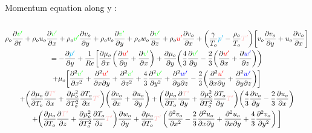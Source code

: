 \documentclass[ border=0pt, a4paper, 11pt]{article}
\numberwithin{equation}{section}
\numberwithin{equation}{section}
\renewcommand{\u}{\textcolor{red}{u'}}
\renewcommand{\v}{\textcolor{green}{v'}}
\newcommand{\w}{\textcolor{blue}{w'}}
\newcommand{\p}{\textcolor{cyan}{p'}}
\newcommand{\T}{\textcolor{pink}{T'}}
\begin{document}
Momentum equation along y :
\begin{multline}
\\\rho_o\frac{\partial \v }{\partial t} 
%
+\rho_ou_o\frac{\partial \v }{\partial x} + \rho_o\v \frac{\partial v_o}{\partial y}+\rho_ov_o\frac{\partial \v }{\partial y}+ \rho_ow_o\frac{\partial \v }{\partial z}
%
+\rho_o\u \frac{\partial v_o}{\partial x}
%
+ \bigg(\frac{\gamma}{T_o} \p  - \frac{\rho_o}{T_o} \T\bigg)\bigg[v_o\frac{\partial v_o}{\partial y} + u_o \frac{ \partial v_o} {\partial x}\bigg] \\
%
=-\frac{\partial \p }{\partial y} 
%
 + \frac{1}{Re} \bigg[\frac{\partial\mu_o}{\partial x}\bigg( \frac{\partial \u}{\partial y}+ \frac{\partial \v}{\partial x}   \bigg) +\frac{\partial\mu_o}{\partial y}\bigg( \frac{4}{3}\frac{\partial \v}{\partial y} - \frac{2}{3} \bigg(\frac{\partial \u}{\partial x}+ \frac{\partial \w}{\partial z}\bigg)    \bigg)\\
 +\mu_o\bigg[ \frac{\partial^2 \v}{\partial x^2}+\frac{\partial^2 \u }{\partial x\partial  y}+ \frac{\partial^2 \v }{ \partial z^2}+\frac{4}{3}\frac{\partial^2 \v }{ \partial y^2}+\frac{\partial^2 \w }{\partial y \partial z}-\frac{2}{3}\bigg(\frac{\partial^2 \u}{\partial x\partial y}+\frac{\partial^2 \w}{\partial y\partial z}\bigg)\bigg] \\ 
+\bigg(\frac{\partial  \mu_o }{\partial T_o}\frac{\partial \T }{\partial x} + \frac{\partial  \mu_o^2 }{\partial T_o^2}\frac{\partial T_o }{\partial x} \T \bigg)\bigg(\frac{\partial v_o}{\partial x} + \frac{\partial u_o}{\partial y}\bigg)
%
+\bigg(\frac{\partial  \mu_o }{\partial T_o}\frac{\partial \T }{\partial y} + \frac{\partial  \mu_o^2 }{\partial T_o^2}\frac{\partial T_o }{\partial y} \T \bigg)\bigg( \frac{4}{3} \frac{\partial v_o}{\partial y} - \frac{2}{3}\frac{\partial u_o}{\partial x}\bigg) \\
%
+\bigg(\frac{\partial  \mu_o }{\partial T_o}\frac{\partial \T }{\partial z} + \frac{\partial  \mu_o^2 }{\partial T_o^2}\frac{\partial T_o }{\partial z} \T \bigg) \frac{\partial w_o}{\partial y} 
 + \frac{\partial  \mu_o }{\partial T_o}\T \left(\frac{\partial^2 v_o}{\partial x^2}-\frac{2}{3} \frac{\partial^2 u_o}{\partial x\partial y} + \frac{\partial^2 u_o}{\partial x \partial y} + \frac{4}{3} \frac{\partial^2 v_o}{\partial y^2} \right) \bigg]\\
      \label{ymomentum}
\end{multline}
\end{document}
